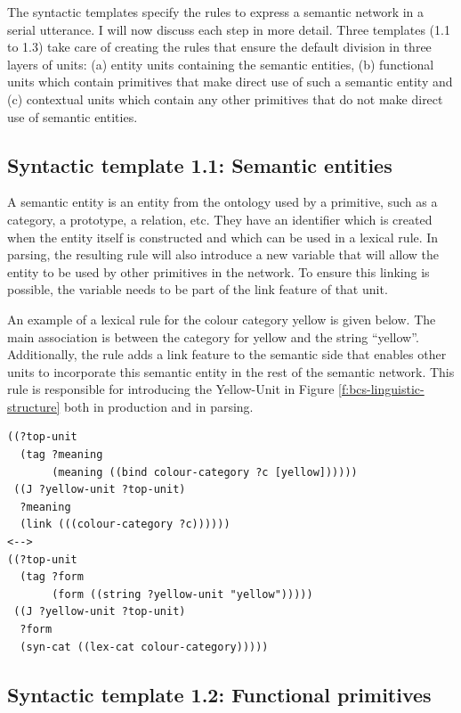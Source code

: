 The syntactic templates specify the rules to express a semantic
network in a serial utterance. I will now discuss each step in more
detail. Three templates (1.1 to 1.3) take care of creating the rules
that ensure the default division in three layers of units: (a) entity
units containing the semantic entities, (b) functional units which
contain primitives that make direct use of such a semantic entity and
(c) contextual units which contain any other primitives that do not
make direct use of semantic entities.

\subsection{Syntactic template 1.1: Semantic entities}

A semantic entity is an entity from the ontology used by a primitive,
such as a category, a prototype, a relation, etc. They have an
identifier which is created when the entity itself is constructed and
which can be used in a lexical rule. In parsing, the resulting rule
will also introduce a new variable that will allow the entity to be
used by other primitives in the network. To ensure this linking is
possible, the variable needs to be part of the link feature of that
unit.

An example of a lexical rule for the colour category yellow is given
below. The main association is between the category for yellow and the
string ``yellow''. Additionally, the rule adds a link feature to the
semantic side that enables other units to incorporate this semantic
entity in the rest of the semantic network. This rule is responsible
for introducing the Yellow-Unit in Figure
\ref{f:bcs-linguistic-structure} both in production and in parsing.

\footnotesize
\begin{Verbatim}[frame=lines, label=Entity rule for yellow]
((?top-unit
  (tag ?meaning 
       (meaning ((bind colour-category ?c [yellow])))))
 ((J ?yellow-unit ?top-unit)
  ?meaning
  (link (((colour-category ?c))))))
<-->
((?top-unit
  (tag ?form 
       (form ((string ?yellow-unit "yellow")))))
 ((J ?yellow-unit ?top-unit)
  ?form
  (syn-cat ((lex-cat colour-category)))))
\end{Verbatim}
\normalsize

\subsection{Syntactic template 1.2: Functional primitives}

